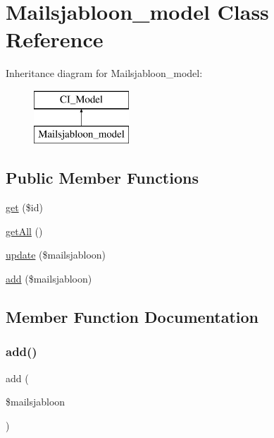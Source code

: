 \hypertarget{class_mailsjabloon__model}{}\section{Mailsjabloon\+\_\+model Class Reference}
\label{class_mailsjabloon__model}
Inheritance diagram for Mailsjabloon\+\_\+model\+:\begin{figure}[H]
\begin{center}
\leavevmode
\includegraphics[height=2.000000cm]{class_mailsjabloon__model}
\end{center}
\end{figure}
\subsection*{Public Member Functions}
\begin{DoxyCompactItemize}
\item 
\mbox{\hyperlink{class_mailsjabloon__model_a50e3bfb586b2f42932a6a93f3fbb0828}{get}} (\$id)
\item 
\mbox{\hyperlink{class_mailsjabloon__model_aba0d5b303383fb5b1fabb5fd01cd3800}{get\+All}} ()
\item 
\mbox{\hyperlink{class_mailsjabloon__model_ae7c31bc24182f5bed6dc1bfb9652e9ed}{update}} (\$mailsjabloon)
\item 
\mbox{\hyperlink{class_mailsjabloon__model_a412547fc897d39826ee90937b53995e6}{add}} (\$mailsjabloon)
\end{DoxyCompactItemize}


\subsection{Member Function Documentation}
\mbox{\label{class_mailsjabloon__model_a412547fc897d39826ee90937b53995e6}} 
\subsubsection{\texorpdfstring{add()}{add()}}
{\footnotesize\ttfamily add (\begin{DoxyParamCaption}\item[{}]{\$mailsjabloon }\end{DoxyParamCaption})}

